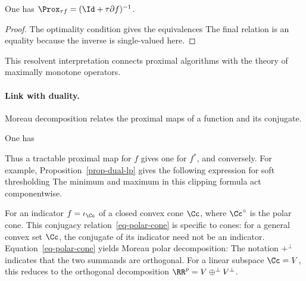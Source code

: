 \begin{prop}
	One has $\Prox_{\tau f} = (\Id+\tau\partial f)^{-1}$.
\end{prop}
\begin{proof}
The optimality condition gives the equivalences
The final relation is an equality because the inverse is single-valued here.
\end{proof}

This resolvent interpretation connects proximal algorithms with the theory of maximally monotone operators.

\paragraph{Link with duality.}

Moreau decomposition relates the proximal maps of a function and its conjugate.

\begin{thm}
	One has
\end{thm}

Thus a tractable proximal map for $f$ gives one for $f^*$, and conversely.
%
For example, Proposition~\ref{prop-dual-lp} gives the following expression for soft thresholding
The minimum and maximum in this clipping formula act componentwise.

For an indicator $f=\iota_{\Cc}$ of a closed convex cone $\Cc$,
where $\Cc^\circ$ is the polar cone. This conjugacy relation~\eqref{eq-polar-cone} is specific to cones: for a general convex set $\Cc$, the conjugate of its indicator need not be an indicator.
%
Equation~\eqref{eq-polar-cone} yields Moreau polar decomposition:
The notation $+^\bot$ indicates that the two summands are orthogonal.
%
For a linear subspace $\Cc=V$, this reduces to the orthogonal decomposition $\RR^p = V \oplus^\bot V^\bot$.

